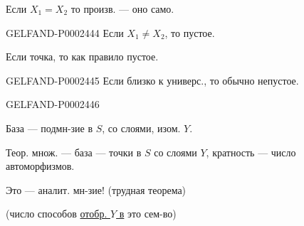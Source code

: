 Если $X_1=X_2$ то произв. — оно само.



\begin{GelfandAdjacentEvidence}{GELFAND-P000244}{4}
Если $X_1\ne X_2$, то пустое.



\end{GelfandAdjacentEvidence}

Если точка, то как правило пустое.



\begin{GelfandAdjacentEvidence}{GELFAND-P000244}{5}
Если близко к универс., то обычно непустое.




\end{GelfandAdjacentEvidence}
\begin{GelfandAdjacentEvidence}{GELFAND-P000244}{6}

База — подмн-зие в $S$, со слоями, изом. $Y$.



\end{GelfandAdjacentEvidence}

Теор. множ. — база — точки в $S$ со слоями $Y$, кратность — число автоморфизмов.



Это — аналит. мн-зие! (трудная теорема)



(число способов \underline{отобр. $Y$ в} это сем-во)



